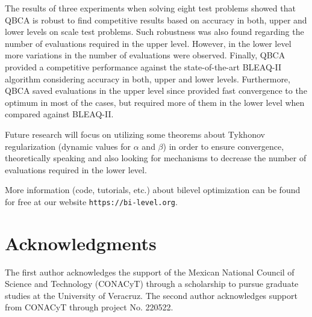 \documentclass[conference]{IEEEtran}
\theoremstyle{definition}
\begin{document}
The results of three experiments when solving eight test problems showed that QBCA
is robust to find competitive results based on accuracy in both, upper and lower
levels on scale test problems. Such robustness was also found regarding the number of evaluations required
in the upper level. However, in the lower level more variations in the number of
evaluations were observed. Finally, QBCA provided a competitive performance against
the state-of-the-art BLEAQ-II algorithm considering accuracy in both, upper and 
lower levels. Furthermore, QBCA saved evaluations in the upper level since provided fast convergence to the optimum in most of the cases, but required
more of them in the lower level when compared against BLEAQ-II. 

Future research will focus on utilizing some theorems about Tykhonov regularization
(dynamic values for $\alpha$ and $\beta$) in order to ensure convergence, theoretically
speaking and also looking for mechanisms to decrease the number of evaluations
required in the lower level.

More information (code, tutorials, etc.) about bilevel optimization can be found
for free at our website \verb|https://bi-level.org|.


\section*{Acknowledgments} %
The first author acknowledges the support of the Mexican National Council of Science
and Technology (CONACyT) through a scholarship to pursue graduate studies at the
University of Veracruz. The second author acknowledges support from CONACyT through
project No. 220522. 






\end{document}
